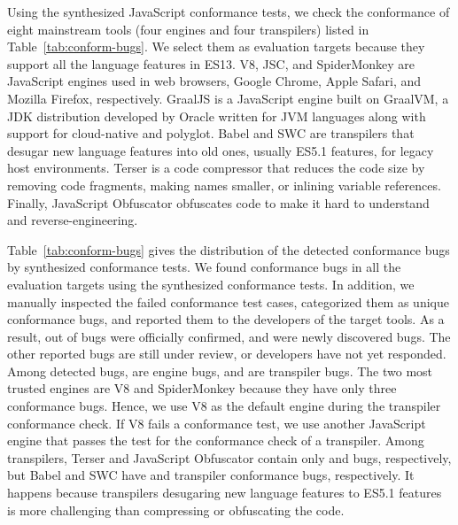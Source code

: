 
Using the synthesized JavaScript conformance tests, we check the conformance of
eight mainstream tools (four engines and four transpilers) listed in
Table~\ref{tab:conform-bugs}.
%
We select them as evaluation targets because they support all the language
features in ES13.
%
V8, JSC, and SpiderMonkey are JavaScript engines used in web browsers, Google
Chrome, Apple Safari, and Mozilla Firefox, respectively.
%
GraalJS is a JavaScript engine built on GraalVM, a JDK distribution developed by
Oracle written for JVM languages along with support for cloud-native and
polyglot.
%
Babel and SWC are transpilers that desugar new language features into old ones,
usually ES5.1 features, for legacy host environments.
%
Terser is a code compressor that reduces the code size by removing code
fragments, making names smaller, or inlining variable references.
%
Finally, JavaScript Obfuscator obfuscates code to make it hard to understand and
reverse-engineering.


Table~\ref{tab:conform-bugs} gives the distribution of the detected conformance
bugs by  synthesized conformance tests.
%
We found conformance bugs in all the evaluation targets using the synthesized
conformance tests.
%
In addition, we manually inspected the failed conformance test cases,
categorized them as  unique conformance bugs, and reported them to
the developers of the target tools.
%
As a result,  out of  bugs were officially confirmed, and
 were newly discovered bugs.
%
The other  reported bugs are still under review, or developers have
not yet responded.
%
Among  detected bugs,  are engine bugs, and  are
transpiler bugs.
%
The two most trusted engines are V8 and SpiderMonkey because they have only
three conformance bugs.
%
Hence, we use V8 as the default engine during the transpiler conformance check.
%
If V8 fails a conformance test, we use another JavaScript engine that passes the
test for the conformance check of a transpiler.
%
Among transpilers, Terser and JavaScript Obfuscator contain only  and
 bugs, respectively, but Babel and SWC have  and
 transpiler conformance bugs, respectively.
%
It happens because transpilers desugaring new language features to ES5.1
features is more challenging than compressing or obfuscating the code.

